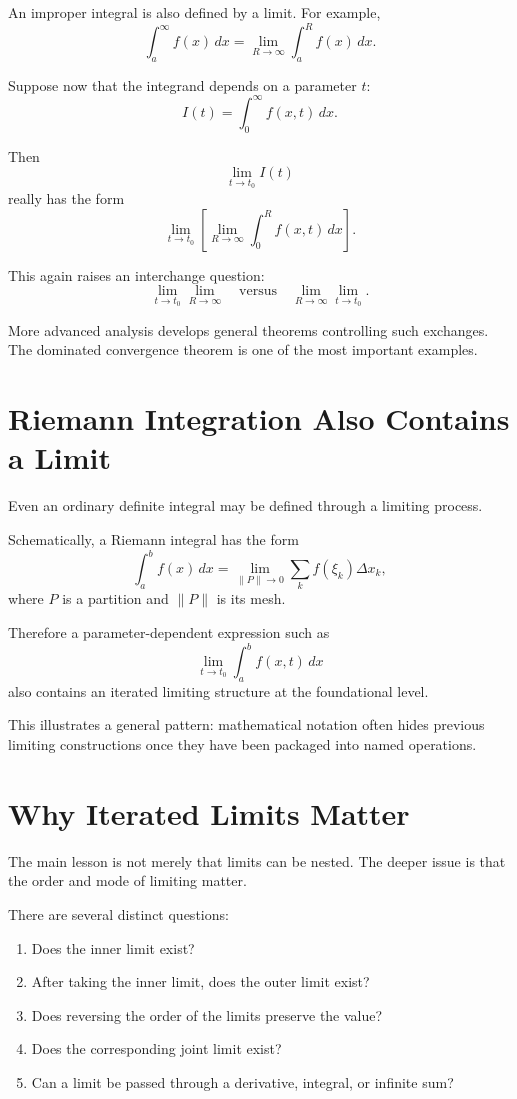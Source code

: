 \documentclass{essay}
\begin{document}
An improper integral is also defined by a limit. For example,
\[
\int_a^\infty f(x)\,dx
=
\lim_{R\to\infty}
\int_a^R f(x)\,dx.
\]

Suppose now that the integrand depends on a parameter \(t\):
\[
I(t)
=
\int_0^\infty f(x,t)\,dx.
\]

Then
\[
\lim_{t\to t_0}I(t)
\]
really has the form
\[
\lim_{t\to t_0}
\left[
\lim_{R\to\infty}
\int_0^R f(x,t)\,dx
\right].
\]

This again raises an interchange question:
\[
\lim_{t\to t_0}\lim_{R\to\infty}
\quad\text{versus}\quad
\lim_{R\to\infty}\lim_{t\to t_0}.
\]

More advanced analysis develops general theorems controlling such exchanges. The dominated convergence theorem is one of the most important examples.

\section{Riemann Integration Also Contains a Limit}

Even an ordinary definite integral may be defined through a limiting process.

Schematically, a Riemann integral has the form
\[
\int_a^b f(x)\,dx
=
\lim_{\lVert P\rVert\to0}
\sum_{k}f(\xi_k)\Delta x_k,
\]
where \(P\) is a partition and \(\lVert P\rVert\) is its mesh.

Therefore a parameter-dependent expression such as
\[
\lim_{t\to t_0}
\int_a^b f(x,t)\,dx
\]
also contains an iterated limiting structure at the foundational level.

This illustrates a general pattern: mathematical notation often hides previous limiting constructions once they have been packaged into named operations.

\section{Why Iterated Limits Matter}

The main lesson is not merely that limits can be nested. The deeper issue is that the order and mode of limiting matter.

There are several distinct questions:

\begin{enumerate}
    \item Does the inner limit exist?
    \item After taking the inner limit, does the outer limit exist?
    \item Does reversing the order of the limits preserve the value?
    \item Does the corresponding joint limit exist?
    \item Can a limit be passed through a derivative, integral, or infinite sum?
\end{enumerate}
\end{document}
